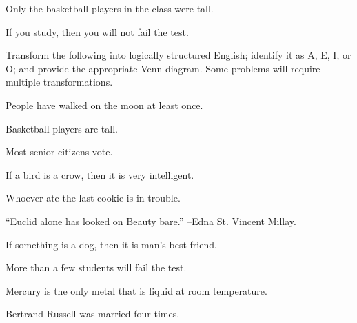 \begin{exercises}
\item Only the basketball players in the class were tall. 

\item If you study, then you will not fail the test.

\end{exercises}


\noindent\problempart Transform the following into logically structured English; identify it as A, E, I, or O; and provide the appropriate Venn diagram. Some problems will require multiple transformations.

\begin{exercises}
\item People have walked on the moon at least once.
\item Basketball players are tall.
\item Most senior citizens vote.
\item If a bird is a crow, then it is very intelligent.
\item Whoever ate the last cookie is in trouble.
\item ``Euclid alone has looked on Beauty bare.'' --Edna St. Vincent Millay.
\item If something is a dog, then it is man's best friend.
\item More than a few students will fail the test.
\item Mercury is the only metal that is liquid at room temperature.
\item Bertrand Russell was married four times.
\end{exercises}

